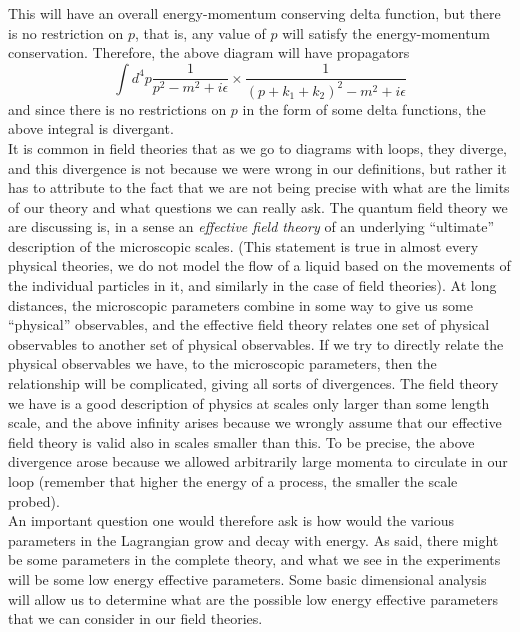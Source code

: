 \documentclass[11pt, notitlepage]{report}
\numberwithin{equation}{section}
\begin{document}
This will have an overall energy-momentum conserving delta function, but there is no restriction on \(p\), that is, any value of \(p\) will satisfy the energy-momentum conservation. Therefore, the above diagram will have propagators
\begin{equation*}
    \int d^4p \frac{1}{p^2 - m^2 + i\epsilon}\times \frac{1}{(p+k_1+k_2)^2 - m^2 + i\epsilon}
\end{equation*}
and since there is no restrictions on \(p\) in the form of some delta functions, the above integral is divergant.\\

It is common in field theories that as we go to diagrams with loops, they diverge, and this divergence is not because we were wrong in our definitions, but rather it has to attribute to the fact that we are not being precise with what are the limits of our theory and what questions we can really ask. The quantum field theory we are discussing is, in a sense an \textit{effective field theory} of an underlying ``ultimate'' description of the microscopic scales. (This statement is true in almost every physical theories, we do not model the flow of a liquid based on the movements of the individual particles in it, and similarly in the case of field theories). At long distances, the microscopic parameters combine in some way to give us some ``physical'' observables, and the effective field theory relates one set of physical observables to another set of physical observables. If we try to directly relate the physical observables we have, to the microscopic parameters, then the relationship will be complicated, giving all sorts of divergences. The field theory we have is a good description of physics at scales only larger than some length scale, and the above infinity arises because we wrongly assume that our effective field theory is valid also in scales smaller than this. To be precise, the above divergence arose because we allowed arbitrarily large momenta to circulate in our loop (remember that higher the energy of a process, the smaller the scale probed).\\

An important question one would therefore ask is how would the various parameters in the Lagrangian grow and decay with energy. As said, there might be some parameters in the complete theory, and what we see in the experiments will be some low energy effective parameters. Some basic dimensional analysis will allow us to determine what are the possible low energy effective parameters that we can consider in our field theories.
\end{document}
